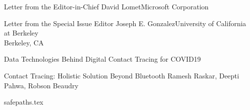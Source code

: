 \documentclass[11pt]{article}
\begin{document}


\begin{bulletin}

%
%

\begin{lettersection}


\begin{letter}{Letter from the Editor-in-Chief}
{David Lomet}{Microsoft Corporation}

\end{letter}
%
\newpage
%
%

\begin{letter}{Letter from the Special Issue Editor}
{Joseph E. Gonzalez}{University of California at Berkeley\\ Berkeley, CA}
\graphicspath{{letters/}}

\end{letter}

\end{lettersection}



\begin{articlesection}{Data Technologies Behind Digital Contact Tracing for COVID19}
%
%
%


\begin{article}
{Contact Tracing: Holistic Solution Beyond Bluetooth}
{Ramesh Raskar, Deepti Pahwa, Robson Beaudry }
\graphicspath{{submissions/safepaths/}}
{safepaths.tex}
\end{article}



\end{articlesection}
\end{bulletin}
\end{document}
